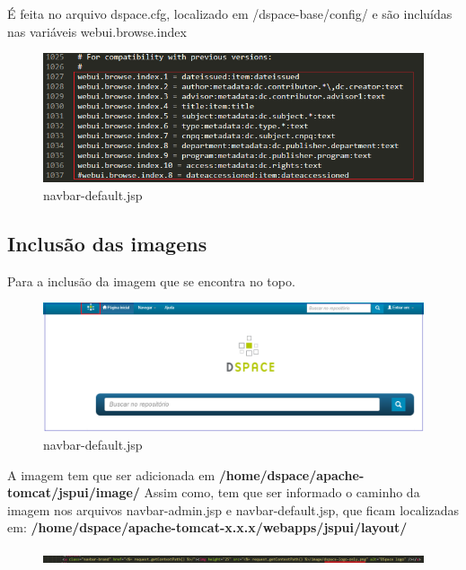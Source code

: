 \documentclass[12pt,hidelinks]{article}
\begin{document}
É feita no arquivo dspace.cfg, localizado em /dspace-base/config/ e são incluídas nas variáveis webui.browse.index


    \begin{figure}[!htp]
        \centering
        \includegraphics[scale=0.5]{figura/webui-browse-index.png}
        \caption{navbar-default.jsp}
        \label{Rotulo}
    \end{figure}
 
\newpage
\subsection{Inclusão das imagens}
       
Para a inclusão da imagem que se encontra no topo.

\begin{figure}[!htp]
        \centering
        \includegraphics[scale=0.5]{figura/logo-topo.png}
        \caption{navbar-default.jsp}
        \label{Rotulo}
    \end{figure}
    
A imagem tem que ser adicionada em \textbf{/home/dspace/apache-tomcat/jspui/image/}  
\singlespacing
Assim como, tem que ser informado o caminho da imagem nos arquivos navbar-admin.jsp e navbar-default.jsp, que ficam localizadas em: \textbf{/home/dspace/apache-tomcat-x.x.x/webapps/jspui/layout/}  

\begin{figure}[!htp]
        \centering
        \includegraphics[scale=0.3]{figura/dspace-logo-only1.png}
        \label{Rotulo}
    \end{figure}
    
\end{document}
